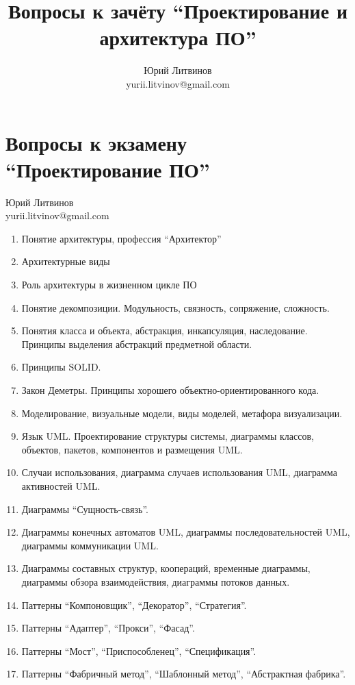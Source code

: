 \documentclass[a5paper]{article}
\title{Вопросы к зачёту ``Проектирование и архитектура ПО''}
\author{Юрий Литвинов\\\small{yurii.litvinov@gmail.com}}
\begin{document}
\thispagestyle{empty}

\section*{Вопросы к экзамену ``Проектирование ПО''}

\begin{flushright}\begin{small}Юрий Литвинов\\\small{yurii.litvinov@gmail.com}\end{small}\end{flushright}

\begin{enumerate}
	\item Понятие архитектуры, профессия ``Архитектор''
	\item Архитектурные виды 
	\item Роль архитектуры в жизненном цикле ПО
	\item Понятие декомпозиции. Модульность, связность, сопряжение, сложность.
	\item Понятия класса и объекта, абстракция, инкапсуляция, наследование. Принципы выделения абстракций предметной области.
	\item Принципы SOLID.
	\item Закон Деметры. Принципы хорошего объектно-ориентированного кода.
	\item Моделирование, визуальные модели, виды моделей, метафора визуализации.
	\item Язык UML. Проектирование структуры системы, диаграммы классов, объектов, пакетов, компонентов и размещения UML.
	\item Случаи использования, диаграмма случаев использования UML, диаграмма активностей UML.
	\item Диаграммы ``Сущность-связь''.
	\item Диаграммы конечных автоматов UML, диаграммы последовательностей UML, диаграммы коммуникации UML.
	\item Диаграммы составных структур, коопераций, временные диаграммы, диаграммы обзора взаимодействия, диаграммы потоков данных.
	\item Паттерны ``Компоновщик'', ``Декоратор'', ``Стратегия''.
	\item Паттерны ``Адаптер'', ``Прокси'', ``Фасад''.
	\item Паттерны ``Мост'', ``Приспособленец'', ``Спецификация''.
	\item Паттерны ``Фабричный метод'', ``Шаблонный метод'', ``Абстрактная фабрика''.

\end{enumerate}
\end{document}
